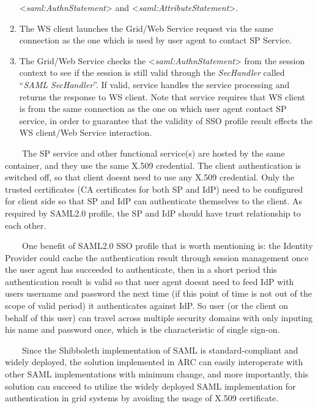 \documentclass{article}
\begin{document}
\begin{enumerate}
{\textless}\textit{saml:AuthnStatement}{\textgreater} and
{\textless}\textit{saml:AttributeStatement}{\textgreater}.
\item The WS client launches the Grid/Web Service request via the same
connection as the one which is used by user agent to contact SP
Service.
\item The Grid/Web Service checks the
{\textless}\textit{saml:AuthnStatement}{\textgreater} from the session
context to see if the session is still valid through the
\textit{SecHandler} called {\textquotedblleft}\textit{SAML
SecHandler}{\textquotedblright}. If valid, service handles the service
processing and returns the response to WS client. Note that service
requires that WS client is from the same connection as the one on which
user agent contact SP service, in order to guarantee that the validity
of SSO profile result effects the WS client/Web Service interaction.
\end{enumerate}
\ \ \ \ The SP service and other functional service(s) are hosted by the
same container, and they use the same X.509 credential. The client
authentication is switched off, so that client doesn{\textquotesingle}t
need to use any X.509 credential. Only the trusted certificates (CA
certificates for both SP and IdP) need to be configured for client side
so that SP and IdP can authenticate themselves to the client. As
required by SAML2.0 profile, the SP and IdP should have trust
relationship to each other.

\ \ \ \ One benefit of SAML2.0 SSO profile that is worth mentioning is:
the Identity Provider could cache the authentication result through
session management once the user agent has succeeded to authenticate,
then in a short period this authentication result is valid so that user
agent doesn{\textquotesingle}t need to feed IdP with
user{\textquotesingle}s username and password the next time (if this
point of time is not out of the scope of valid period) it authenticates
against IdP. So user (or the client on behalf of this user) can travel
across multiple security domains with only inputing his name and
password once, which is the characteristic of single sign-on.

\ \ \ \ Since the Shibboleth implementation of SAML is
standard-compliant and widely deployed, the solution implemented in ARC
can easily interoperate with other SAML implementations with minimum
change, and more importantly, this solution can succeed to utilize the
widely deployed SAML implementation for authentication in grid systems
by avoiding the usage of X.509 certificate.
\end{document}
